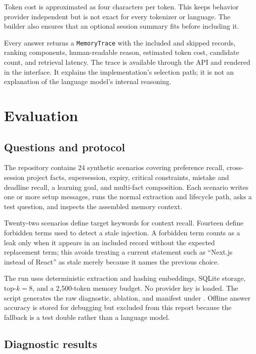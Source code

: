 \documentclass[11pt]{article}
\begin{document}
Token cost is approximated as four characters per token. This keeps behavior
provider independent but is not exact for every tokenizer or language. The
builder also ensures that an optional session summary fits before including it.

Every answer returns a \texttt{MemoryTrace} with the included and skipped
records, ranking components, human-readable reason, estimated token cost,
candidate count, and retrieval latency. The trace is available through the API
and rendered in the interface. It explains the implementation's selection
path; it is not an explanation of the language model's internal reasoning.

\section{Evaluation}
\label{sec:evaluation}

\subsection{Questions and protocol}

The repository contains 24 synthetic scenarios covering preference recall,
cross-session project facts, supersession, expiry, critical constraints,
mistake and deadline recall, a learning goal, and multi-fact composition. Each
scenario writes one or more setup messages, runs the normal extraction and
lifecycle path, asks a test question, and inspects the assembled memory context.

Twenty-two scenarios define target keywords for context recall. Fourteen define
forbidden terms used to detect a stale injection. A forbidden term counts as a
leak only when it appears in an included record without the expected replacement
term; this avoids treating a current statement such as ``Next.js instead of
React'' as stale merely because it names the previous choice.

The run uses deterministic extraction and hashing embeddings, SQLite storage,
top-$k=8$, and a 2,500-token memory budget. No provider key is loaded. The
script  generates the raw diagnostic,
ablation, and manifest under . Offline answer accuracy is
stored for debugging but excluded from this report because the fallback is a
test double rather than a language model.

\subsection{Diagnostic results}
\end{document}
